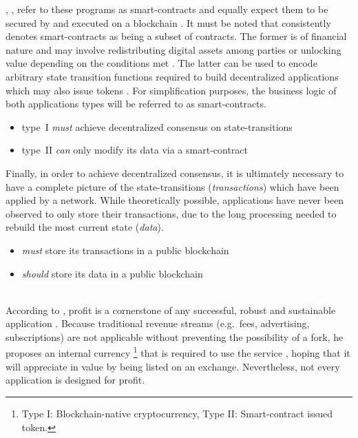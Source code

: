 \begin{description}[format={\storedescriptionlabel}]
	\citeauthor{Raval.2016}, \citeauthor{Antonopoulos.2018}, refer to these programs as smart-contracts and equally expect them to be secured by and executed on a blockchain \cite[p.~13]{Raval.2016} \cite[pp.~23,~34]{Antonopoulos.2018}. It must be noted that \citeauthor{Buterin2014} consistently denotes smart-contracts as being a subset of contracts. The former is of financial nature and may involve redistributing digital assets among parties or unlocking value depending on the conditions met \cite[pp.~1,~13]{EthereumWhitepaper}. The latter can be used to encode arbitrary state transition functions required to build decentralized applications which may also issue tokens \cite[pp.~1,~19]{EthereumWhitepaper}. For simplification purposes, the business logic of both applications types will be referred to as smart-contracts. 	

	\begin{itemize}
  		\item type~I \textit{must} achieve decentralized consensus on state-transitions
  		\item type~II \textit{can} only modify its data via a smart-contract
	\end{itemize}

	Finally, in order to achieve decentralized consensus, it is ultimately necessary to have a complete picture of the state-transitions (\textit{transactions}) which have been applied by a network. While theoretically possible, applications have never been observed to only store their transactions, due to the long processing needed to rebuild the most current state (\textit{data}). 
	
	\begin{itemize}
  		\item \textit{must} store its transactions in a public blockchain
  		\item \textit{should} store its data in a public blockchain
	\end{itemize}

	\item[Internal currency]
	\hfill \\
	According to \citeauthor{Raval.2016}, profit is a cornerstone of any successful, robust and sustainable application \cite[p.~9]{Raval.2016}. Because traditional revenue streams (e.g.~fees, advertising, subscriptions) are not applicable without preventing the possibility of a fork, he proposes an internal currency \footnote{Type I: Blockchain-native cryptocurrency, Type II: Smart-contract issued token.} that is required to use the service \cite[p.~11]{Raval.2016}, hoping that it will appreciate in value by being listed on an exchange. Nevertheless, not every application is designed for profit.
	

\end{description}
